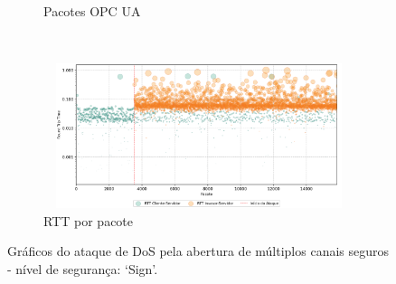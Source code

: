 \begin{apendicesenv}
\begin{figure}[htbp!]
\begin{subfigure}[t]{0.5\textwidth}
        \caption{Pacotes OPC UA}
    \end{subfigure}%
    ~
    \begin{subfigure}[t]{0.5\textwidth}
        \centering
        \includegraphics[width=1\textwidth, height=120pt]{USPSC-img/output/cropped/1-dos_open_multiple_secure_channels-rttp.png}
        \caption{RTT por pacote}
    \end{subfigure}%
    \label{fig:1-dos_open_multiple_secure_channels}
    \caption{Gráficos do ataque de DoS pela abertura de múltiplos canais seguros - nível de segurança: `Sign'.}
\end{figure}


\end{apendicesenv}
